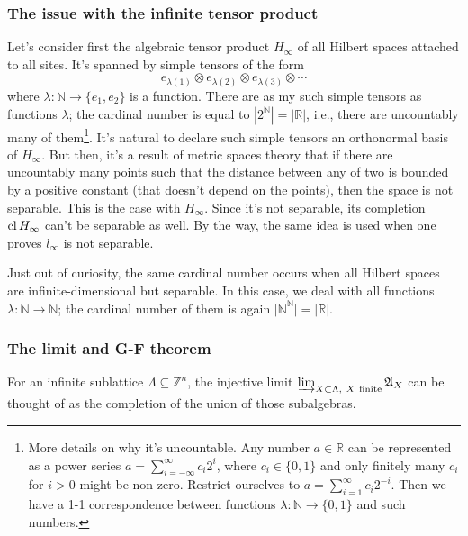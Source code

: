 \subsubsection{The issue with the infinite tensor product}
Let's consider first the algebraic tensor product $H_{\infty}$ of all Hilbert spaces attached to all sites. It's spanned by simple tensors of the form
\[
e_{\lambda(1)} \otimes e_{\lambda(2)} \otimes e_{\lambda(3)} \otimes \cdots 
\]
where $\lambda : \mathbb N \rightarrow \{e_1,e_2\}$ is a function. There are as my such simple tensors as functions $\lambda$; the cardinal number is equal to $|2^{\mathbb N}| = |\mathbb R|$, i.e., there are uncountably many of them\footnote{More details on why it's uncountable. Any number $a \in \mathbb R$ can be represented as a power series $a = \sum_{i=-\infty}^\infty c_i 2^{i}$, where $c_i \in \{0,1\}$ and only finitely many $c_i$ for $i > 0$ might be non-zero. Restrict ourselves to $a = \sum_{i=1}^{\infty}c_i 2^{-i}$. Then we have a 1-1 correspondence between functions $\lambda : \mathbb N \rightarrow \{0,1\}$ and such numbers. }. It's natural to declare such simple tensors an orthonormal basis of $H_{\infty}$. But then, it's a result of metric spaces theory that if there are uncountably many points such that the distance between any of two is bounded by a positive constant (that doesn't depend on the points), then the space is not separable. This is the case with $H_{\infty}$. Since it's not separable, its completion $\operatorname{cl} H_{\infty}$ can't be separable as well. By the way, the same idea is used when one proves $l_{\infty}$ is not separable.

Just out of curiosity, the same cardinal number occurs when all Hilbert spaces are infinite-dimensional but separable. In this case, we deal with all functions $\lambda : \mathbb N \rightarrow \mathbb N$; the cardinal number of them is again ${|\mathbb N}^{\mathbb N}| = |\mathbb R|$.

\subsubsection{The limit and G-F theorem}

For an infinite sublattice $\Lambda \subseteq \mathbb Z^n$, the injective limit $\varinjlim_{X \subset \Lambda, \ X \ \text{finite}} \mathfrak A_{X}$ can be thought of as the completion of the union of those subalgebras. 

